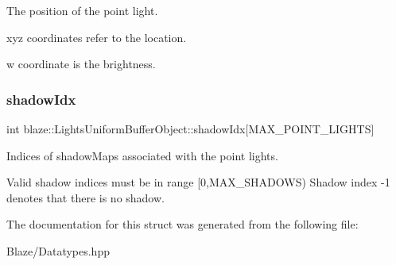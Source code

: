 The position of the point light. 

\begin{DoxyItemize}
\item xyz coordinates refer to the location. \item w coordinate is the brightness. \end{DoxyItemize}
\mbox{\label{structblaze_1_1LightsUniformBufferObject_a3530c4ca1d0e496e88bfb63b880776bb}} 
\subsubsection{\texorpdfstring{shadow\+Idx}{shadowIdx}}
{\footnotesize\ttfamily int blaze\+::\+Lights\+Uniform\+Buffer\+Object\+::shadow\+Idx\mbox{[}M\+A\+X\+\_\+\+P\+O\+I\+N\+T\+\_\+\+L\+I\+G\+H\+TS\mbox{]}}



Indices of shadow\+Maps associated with the point lights. 

Valid shadow indices must be in range \mbox{[}0,M\+A\+X\+\_\+\+S\+H\+A\+D\+O\+WS) Shadow index -\/1 denotes that there is no shadow. 

The documentation for this struct was generated from the following file\+:\begin{DoxyCompactItemize}
\item 
Blaze/Datatypes.\+hpp\end{DoxyCompactItemize}
